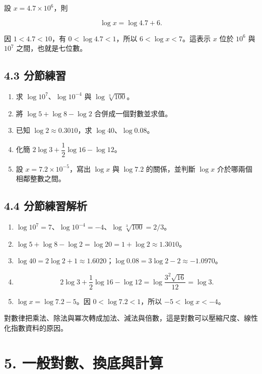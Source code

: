\documentclass[11pt,a4paper]{article}
\providecommand{\tightlist}{%
  \setlength{\itemsep}{0pt}\setlength{\parskip}{0pt}}
\begin{document}
設 \(x=4.7\times10^6\)，則

\[
\log x=\log4.7+6.
\]

因 \(1<4.7<10\)，有 \(0<\log4.7<1\)，所以 \(6<\log x<7\)。這表示 \(x\) 位於 \(10^6\) 與 \(10^7\) 之間，也就是七位數。

\subsection{4.3 分節練習}\label{ux5206ux7bc0ux7df4ux7fd2-3}

\begin{enumerate}
\def\labelenumi{\arabic{enumi}.}
\tightlist
\item
  求 \(\log10^7\)、\(\log10^{-4}\) 與 \(\log\sqrt[3]{100}\)。
\item
  將 \(\log5+\log8-\log2\) 合併成一個對數並求值。
\item
  已知 \(\log2\approx0.3010\)，求 \(\log40\)、\(\log0.08\)。
\item
  化簡 \(2\log3+\dfrac12\log16-\log12\)。
\item
  設 \(x=7.2\times10^{-5}\)，寫出 \(\log x\) 與 \(\log7.2\) 的關係，並判斷 \(\log x\) 介於哪兩個相鄰整數之間。
\end{enumerate}

\subsection{4.4 分節練習解析}\label{ux5206ux7bc0ux7df4ux7fd2ux89e3ux6790-3}

\begin{enumerate}
\def\labelenumi{\arabic{enumi}.}
\tightlist
\item
  \(\log10^7=7\)、\(\log10^{-4}=-4\)、\(\log\sqrt[3]{100}=2/3\)。
\item
  \(\log5+\log8-\log2=\log20=1+\log2\approx1.3010\)。
\item
  \(\log40=2\log2+1\approx1.6020\)；\(\log0.08=3\log2-2\approx-1.0970\)。
\item
  \[
   2\log3+\frac12\log16-\log12
   =\log\frac{3^2\sqrt{16}}{12}=\log3.
   \]
\item
  \(\log x=\log7.2-5\)。因 \(0<\log7.2<1\)，所以 \(-5<\log x<-4\)。
\end{enumerate}

對數律把乘法、除法與冪次轉成加法、減法與倍數，這是對數可以壓縮尺度、線性化指數資料的原因。

\section{5. 一般對數、換底與計算}\label{ux4e00ux822cux5c0dux6578ux63dbux5e95ux8207ux8a08ux7b97}
\end{document}
